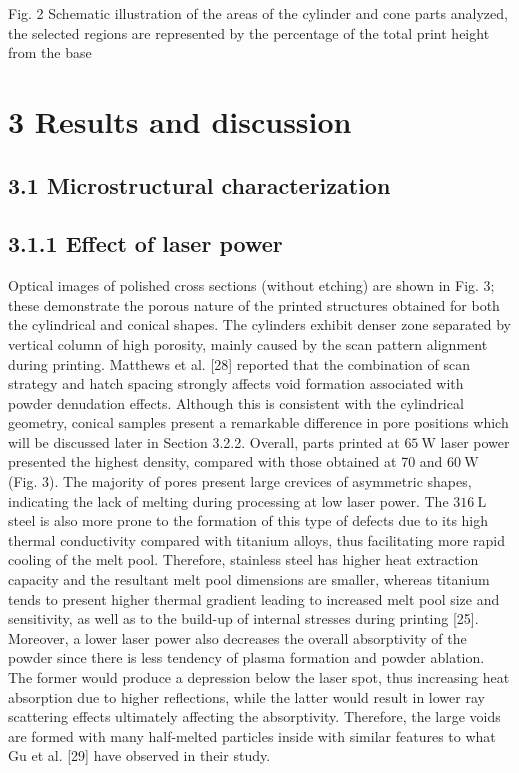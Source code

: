 \documentclass[10pt]{article}
\begin{document}
Fig. 2 Schematic illustration of the areas of the cylinder and cone parts analyzed, the selected regions are represented by the percentage of the total print height from the base

\section*{3 Results and discussion}
\subsection*{3.1 Microstructural characterization}
\subsection*{3.1.1 Effect of laser power}
Optical images of polished cross sections (without etching) are shown in Fig. 3; these demonstrate the porous nature of the printed structures obtained for both the cylindrical and conical shapes. The cylinders exhibit denser zone separated by vertical column of high porosity, mainly caused by the scan pattern alignment during printing. Matthews et al. [28] reported that the combination of scan strategy and hatch spacing strongly affects void formation associated with powder denudation effects. Although this is consistent with the cylindrical geometry, conical samples present a remarkable difference in pore positions which will be discussed later in Section 3.2.2. Overall, parts printed at $65 \mathrm{~W}$ laser power presented the highest density, compared with those obtained at 70 and $60 \mathrm{~W}$ (Fig. 3). The majority of pores present large crevices of asymmetric shapes, indicating the lack of melting during processing at low laser power. The $316 \mathrm{~L}$ steel is also more prone to the formation of this type of defects due to its high thermal conductivity compared with titanium alloys, thus facilitating more rapid cooling of the melt pool. Therefore, stainless steel has higher heat extraction capacity and the resultant melt pool dimensions are smaller, whereas titanium tends to present higher thermal gradient leading to increased melt pool size and sensitivity, as well as to the build-up of internal stresses during printing [25]. Moreover, a lower laser power also decreases the overall absorptivity of the powder since there is less tendency of plasma formation and powder ablation. The former would produce a depression below the laser spot, thus increasing heat absorption due to higher reflections, while the latter would result in lower ray scattering effects ultimately affecting the absorptivity. Therefore, the large voids are formed with many half-melted particles inside with similar features to what Gu et al. [29] have observed in their study.
\end{document}
